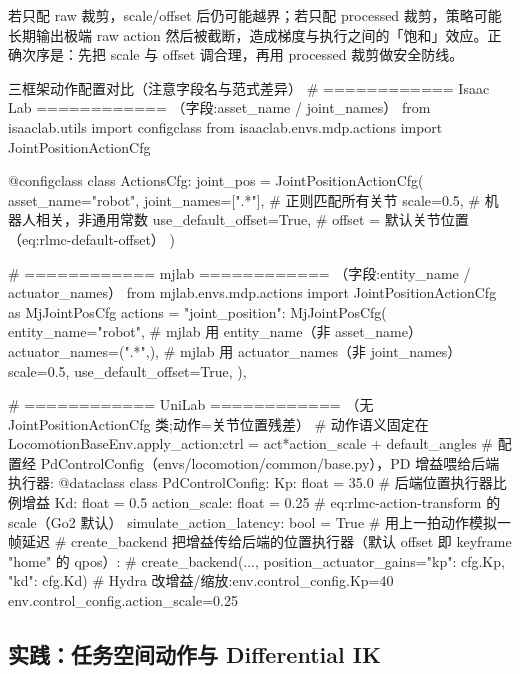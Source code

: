 \begin{pitfall}
若只配 raw 裁剪，scale/offset 后仍可能越界；若只配 processed 裁剪，策略可能长期输出极端 raw action 然后被截断，造成梯度与执行之间的「饱和」效应。正确次序是：先把 scale 与 offset 调合理，再用 processed 裁剪做安全防线。
\end{pitfall}

\begin{codebox}[Python]{三框架动作配置对比（注意字段名与范式差异）}
# ============ Isaac Lab ============ （字段:asset_name / joint_names）
from isaaclab.utils import configclass
from isaaclab.envs.mdp.actions import JointPositionActionCfg

@configclass
class ActionsCfg:
    joint_pos = JointPositionActionCfg(
        asset_name="robot",
        joint_names=[".*"],            # 正则匹配所有关节
        scale=0.5,                     # 机器人相关，非通用常数
        use_default_offset=True,       # offset = 默认关节位置（eq:rlmc-default-offset）
    )

# ============ mjlab ============ （字段:entity_name / actuator_names）
from mjlab.envs.mdp.actions import JointPositionActionCfg as MjJointPosCfg
actions = {
    "joint_position": MjJointPosCfg(
        entity_name="robot",           # mjlab 用 entity_name（非 asset_name）
        actuator_names=(".*",),        # mjlab 用 actuator_names（非 joint_names）
        scale=0.5,
        use_default_offset=True,
    ),
}

# ============ UniLab ============ （无 JointPositionActionCfg 类;动作=关节位置残差）
# 动作语义固定在 LocomotionBaseEnv.apply_action:ctrl = act*action_scale + default_angles
# 配置经 PdControlConfig（envs/locomotion/common/base.py），PD 增益喂给后端执行器:
@dataclass
class PdControlConfig:
    Kp: float = 35.0                   # 后端位置执行器比例增益
    Kd: float = 0.5
    action_scale: float = 0.25         # eq:rlmc-action-transform 的 scale（Go2 默认）
    simulate_action_latency: bool = True   # 用上一拍动作模拟一帧延迟
# create_backend 把增益传给后端的位置执行器（默认 offset 即 keyframe "home" 的 qpos）:
#   create_backend(..., position_actuator_gains={"kp": cfg.Kp, "kd": cfg.Kd})
# Hydra 改增益/缩放:env.control_config.Kp=40 env.control_config.action_scale=0.25
\end{codebox}

\subsection{实践：任务空间动作与 Differential IK}
\label{sec:rlmc-diffik}

